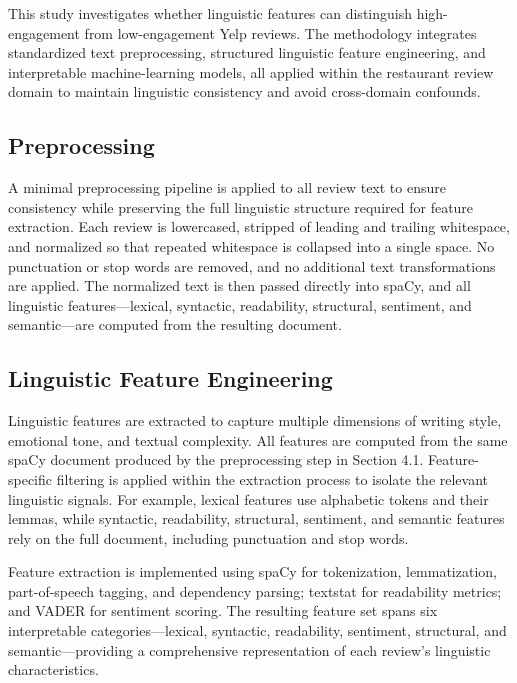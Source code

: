\documentclass[12pt]{article}
\begin{document}
This study investigates whether linguistic features can distinguish high-engagement from low-engagement Yelp reviews. The methodology integrates standardized text preprocessing, structured linguistic feature engineering, and interpretable machine-learning models, all applied within the restaurant review domain to maintain linguistic consistency and avoid cross-domain confounds.

\subsection{Preprocessing}

A minimal preprocessing pipeline is applied to all review text to ensure consistency while preserving the full linguistic structure required for feature extraction. Each review is lowercased, stripped of leading and trailing whitespace, and normalized so that repeated whitespace is collapsed into a single space. No punctuation or stop words are removed, and no additional text transformations are applied. The normalized text is then passed directly into spaCy, and all linguistic features—lexical, syntactic, readability, structural, sentiment, and semantic—are computed from the resulting document.

\subsection{Linguistic Feature Engineering}

Linguistic features are extracted to capture multiple dimensions of writing style, emotional tone, and textual complexity. All features are computed from the same spaCy document produced by the preprocessing step in Section 4.1. Feature-specific filtering is applied within the extraction process to isolate the relevant linguistic signals. For example, lexical features use alphabetic tokens and their lemmas, while syntactic, readability, structural, sentiment, and semantic features rely on the full document, including punctuation and stop words.

Feature extraction is implemented using spaCy for tokenization, lemmatization, part-of-speech tagging, and dependency parsing; textstat for readability metrics; and VADER for sentiment scoring. The resulting feature set spans six interpretable categories—lexical, syntactic, readability, sentiment, structural, and semantic—providing a comprehensive representation of each review’s linguistic characteristics.
\end{document}
